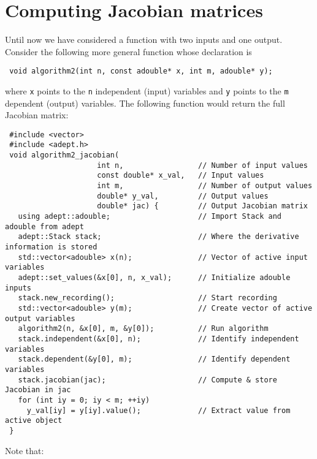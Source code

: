 \documentclass[a4,oneside]{book}
\def\codesize{\small}
\def\code#1{{\codesize\texttt{#1}}}
\begin{document}
\section{Computing Jacobian matrices}
\label{sec:jacobian}
Until now we have considered a function with two inputs and one
output.  Consider the following more general function whose declaration
is
\begin{lstlisting}
 void algorithm2(int n, const adouble* x, int m, adouble* y);
\end{lstlisting}
where \code{x} points to the \code{n} independent (input) variables
and \code{y} points to the \code{m} dependent (output) variables. The
following function would return the full Jacobian matrix:
%
\begin{lstlisting}
 #include <vector>
 #include <adept.h>
 void algorithm2_jacobian(
                     int n,                 // Number of input values
                     const double* x_val,   // Input values
                     int m,                 // Number of output values
                     double* y_val,         // Output values
                     double* jac) {         // Output Jacobian matrix
   using adept::adouble;                    // Import Stack and adouble from adept
   adept::Stack stack;                      // Where the derivative information is stored
   std::vector<adouble> x(n);               // Vector of active input variables
   adept::set_values(&x[0], n, x_val);      // Initialize adouble inputs
   stack.new_recording();                   // Start recording
   std::vector<adouble> y(m);               // Create vector of active output variables
   algorithm2(n, &x[0], m, &y[0]);          // Run algorithm
   stack.independent(&x[0], n);             // Identify independent variables
   stack.dependent(&y[0], m);               // Identify dependent variables
   stack.jacobian(jac);                     // Compute & store Jacobian in jac
   for (int iy = 0; iy < m; ++iy) 
     y_val[iy] = y[iy].value();             // Extract value from active object 
 }
\end{lstlisting}
%
Note that:
\end{document}

